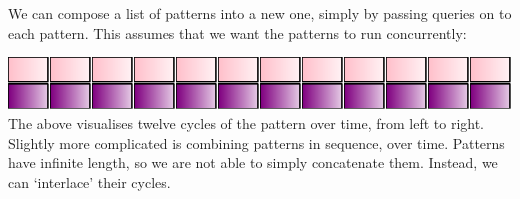 We can compose a list of patterns into a new one, simply by passing
queries on to each pattern. This assumes that we want the patterns to
run concurrently:

\begin{Shaded}
\begin{Highlighting}[]
\NormalTok{ [}\NormalTok{ a] }\OtherTok{{-}\textgreater{}} 
\OtherTok{=}  \OperatorTok{$}\OtherTok{{-}\textgreater{}} \NormalTok{ (}
\end{Highlighting}
\end{Shaded}

\begin{Shaded}
\begin{Highlighting}[]
\OtherTok{=}\NormalTok{ stack [atom }\NormalTok{]}
\end{Highlighting}
\end{Shaded}

\includegraphics{../figures/fig1.pdf}\\

The above visualises twelve cycles of the pattern over time, from left
to right. Slightly more complicated is combining patterns in sequence,
over time. Patterns have infinite length, so we are not able to simply
concatenate them. Instead, we can `interlace' their cycles.

